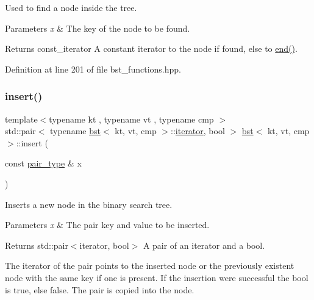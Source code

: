 Used to find a node inside the tree. 


\begin{DoxyParams}{Parameters}
{\em x} & The key of the node to be found. \\
\hline
\end{DoxyParams}
\begin{DoxyReturn}{Returns}
const\+\_\+iterator A constant iterator to the node if found, else to \hyperlink{classbst_aed3a831efc810b5084cb0c9f4adeb16a}{end()}. 
\end{DoxyReturn}


Definition at line 201 of file bst\+\_\+functions.\+hpp.

\mbox{\label{classbst_aaaeffdb4fae1103a3f6185c74ce43281}} 
\subsubsection{\texorpdfstring{insert()}{insert()}\hspace{0.1cm}{\footnotesize\ttfamily [1/2]}}
{\footnotesize\ttfamily template$<$typename kt , typename vt , typename cmp $>$ \\
std\+::pair$<$ typename \hyperlink{classbst}{bst}$<$ kt, vt, cmp $>$\+::\hyperlink{classbst_a429b0445783ff6486882db5dee900ce0}{iterator}, bool $>$ \hyperlink{classbst}{bst}$<$ kt, vt, cmp $>$\+::insert (\begin{DoxyParamCaption}\item[{const \hyperlink{classbst_a7b11cca2a3b4394915600194f741ab16}{pair\+\_\+type} \&}]{x }\end{DoxyParamCaption})}



Inserts a new node in the binary search tree. 


\begin{DoxyParams}{Parameters}
{\em x} & The pair key and value to be inserted. \\
\hline
\end{DoxyParams}
\begin{DoxyReturn}{Returns}
std\+::pair$<$iterator, bool$>$ A pair of an iterator and a bool.
\end{DoxyReturn}
The iterator of the pair points to the inserted node or the previously existent node with the same key if one is present. If the insertion were successful the bool is true, else false. The pair is copied into the node. 

